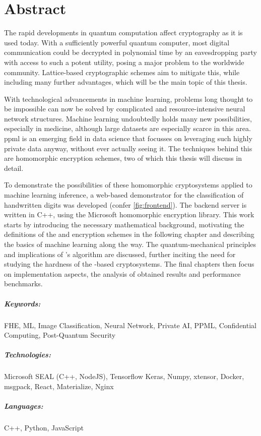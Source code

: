 \chapter*{Abstract}
The rapid developments in quantum computation affect cryptography as it is used today.
With a sufficiently powerful quantum computer, most digital communication could be decrypted in polynomial time by an eavesdropping party with access to such a potent utility, posing a major problem to the worldwide community.
Lattice-based cryptographic schemes aim to mitigate this, while including many further advantages, which will be the main topic of this thesis.

With technological advancements in machine learning, problems long thought to be impossible can now be solved by complicated and resource-intensive neural network structures.
Machine learning undoubtedly holds many new possibilities, especially in medicine, although large datasets are especially scarce in this area.
\Gls{ppml} is an emerging field in data science that focusses on leveraging such highly private data anyway, without ever actually seeing it.
The techniques behind this are homomorphic encryption schemes, two of which this thesis will discuss in detail.

To demonstrate the possibilities of these homomorphic cryptosystems applied to machine learning inference, a web-based demonstrator for the classification of handwritten digits was developed (confer \cref{fig:frontend}).
The backend server is written in C++, using the Microsoft  homomorphic encryption library.
This work starts by introducing the necessary mathematical background, motivating the definitions of the  and  encryption schemes in the following chapter and describing the basics of machine learning along the way.
The quantum-mechanical principles and implications of 's algorithm are discussed, further inciting the need for studying the hardness of the -based cryptosystems.
The final chapters then focus on implementation aspects, the analysis of obtained results and performance benchmarks.

\paragraph{Keywords:}
FHE, ML, Image Classification, Neural Network,
Private AI, PPML, Confidential Computing,
Post-Quantum Security

\paragraph{Technologies:}
Microsoft SEAL (C++, NodeJS),
Tensorflow Keras,
Numpy,
xtensor,
Docker,
msgpack,
React,
Materialize,
Nginx

\paragraph{Languages:}
C++, Python, JavaScript
